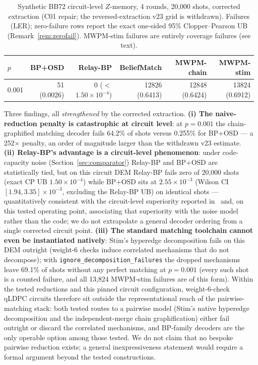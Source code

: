 \documentclass[11pt,a4paper]{article}
\begin{document}
\begin{table}[H]\centering\small
\caption{Synthetic BB72 circuit-level $Z$-memory, 4 rounds, 20{,}000 shots,
  corrected extraction (C01 repair; the reversed-extraction v23 grid is
  withdrawn). Failures (LER); zero-failure rows report the exact one-sided
  95\% Clopper--Pearson UB (Remark~\ref{rem:zerofail}). MWPM-stim failures
  are entirely coverage failures (see text).}
\label{tab:wsc}
\begin{tabular}{@{}lrrrrr@{}}
\toprule
$p$ & BP+OSD & Relay-BP & BeliefMatch & MWPM-chain & MWPM-stim \\
\midrule
0.001 & 51 (0.0026) & 0 ($<$$1.50\!\times\!10^{-4}$) & 12826 (0.6413) & 12848 (0.6424) & 13824 (0.6912) \\
\bottomrule
\end{tabular}
\end{table}

Three findings, all \emph{strengthened} by the corrected extraction.
\textbf{(i) The naive-reduction penalty is catastrophic at circuit level}:
at $p=0.001$ the chain-graphified matching decoder fails 64.2\% of shots
versus 0.255\% for BP+OSD --- a 252$\times$ penalty, an order of magnitude
larger than the withdrawn v23 estimate.
\textbf{(ii) Relay-BP's advantage is a circuit-level phenomenon}: under
code-capacity noise (Section~\ref{sec:comparator}) Relay-BP and BP+OSD are
statistically tied, but on this circuit DEM Relay-BP fails zero of
20{,}000 shots (exact CP UB $1.50\times10^{-4}$) while BP+OSD sits at
$2.55\times10^{-3}$ (Wilson CI $[1.94,3.35]\times10^{-3}$, excluding the
Relay-BP UB) on identical shots --- quantitatively consistent with the
circuit-level superiority reported in~\cite{Muller2025relay} and, on
this tested operating point, associating that superiority with the noise
model rather than the code; we do not extrapolate a general decoder
ordering from a single corrected circuit point.
\textbf{(iii) The standard
matching toolchain cannot even be instantiated natively}: Stim's hyperedge
decomposition fails on this DEM outright (weight-6 checks induce correlated
mechanisms that do not decompose); with
\texttt{ignore\_decomposition\_failures} the dropped mechanisms leave
69.1\% of shots without any perfect matching at $p=0.001$ (every such shot
is a counted failure, and all 13{,}824 MWPM-stim failures are of this
form).
Within the tested reductions and this pinned circuit configuration,
weight-6-check qLDPC circuits therefore sit outside the representational
reach of the pairwise-matching stack: both tested routes to a pairwise
model (Stim's native hyperedge decomposition and the independent-merge
chain graphification) either fail outright or discard the correlated
mechanisms, and BP-family decoders are the only operable option among
those tested. We do not claim that no bespoke pairwise reduction exists;
a general inexpressiveness statement would require a formal argument
beyond the tested constructions.
\end{document}
